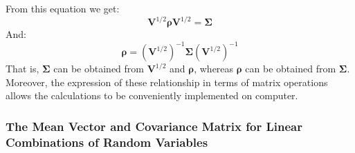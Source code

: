 \documentclass[a4paper]{article}
\begin{document}
    From this equation we get:
    \begin{equation}
        \mathbf{V}^{1/2} \bm{\rho} \mathbf{V}^{1/2} = \bm{\Sigma}
    \end{equation}
    And:
    \begin{equation}
        \bm{\rho} = \left(\mathbf{V}^{1/2}\right)^{-1} \bm{\Sigma} \left(\mathbf{V}^{1/2}\right)^{-1}
    \end{equation}
    That is, $\bm{\Sigma}$ can be obtained from $\mathbf{V}^{1/2}$ and $\bm{\rho}$, whereas $\bm{\rho}$ can be obtained from $\bm{\Sigma}$. Moreover, the expression of these relationship in terms of matrix operations allows the calculations to be conveniently implemented on computer.

    \newpage

    \subsubsection{The Mean Vector and Covariance Matrix for Linear Combinations of Random Variables}
\end{document}
